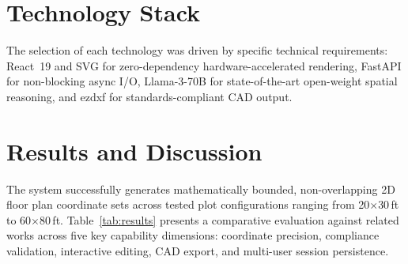 \documentclass[10pt, twocolumn, letterpaper]{article}
\begin{document}
\section{Technology Stack}

The selection of each technology was driven by specific technical requirements: React~19 and SVG for zero-dependency hardware-accelerated rendering, FastAPI for non-blocking async I/O, Llama-3-70B for state-of-the-art open-weight spatial reasoning, and ezdxf for standards-compliant CAD output.

\section{Results and Discussion}

The system successfully generates mathematically bounded, non-overlapping 2D
floor plan coordinate sets across tested plot configurations ranging from
20$\times$30\,ft to 60$\times$80\,ft. Table~\ref{tab:results} presents a
comparative evaluation against related works across five key capability
dimensions: coordinate precision, compliance validation, interactive editing,
CAD export, and multi-user session persistence.
\end{document}
